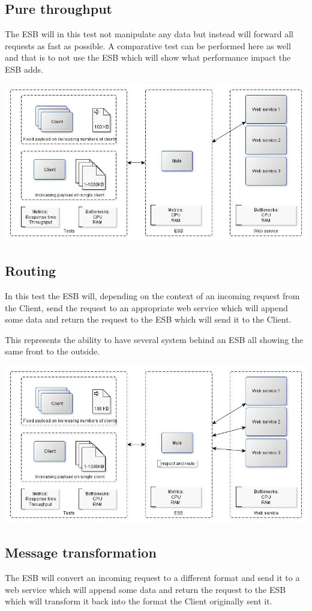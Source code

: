 \subsection{Pure throughput}
The ESB will in this test not manipulate any data but instead will forward all requests as fast as possible. 
A comparative test can be performed here as well and that is to not use the ESB which will show what performance impact the ESB adds. 

\includegraphics[scale=0.5]{img/direct_proxy}

\subsection{Routing}
In this test the ESB will, depending on the context of an incoming request from the Client, send the request to an appropriate web service which will append some data and return the request to the ESB which will send it to the Client.

This represents the ability to have several system behind an ESB all showing the same front to the outside.

\includegraphics[scale=0.5]{img/Routing}
\subsection{Message transformation}
The ESB will convert an incoming request to a different format and send it to a web service which will append some data and return the request to the ESB which will transform it back into the format the Client originally sent it.


